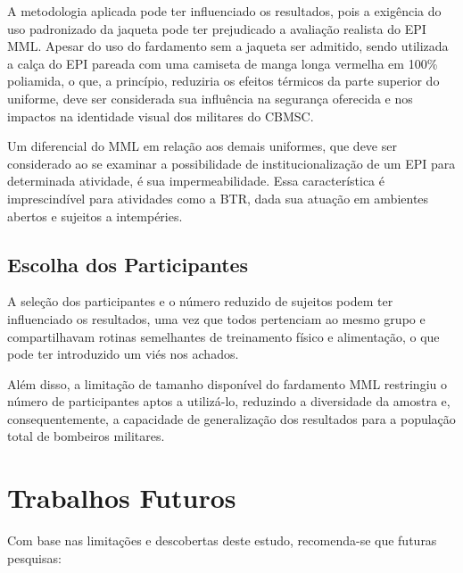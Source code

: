             A metodologia aplicada pode ter influenciado os resultados, pois a exigência do uso 
            padronizado da jaqueta pode ter prejudicado a avaliação realista do \acrshort{EPI} \acrshort{MML}.
            Apesar do uso do fardamento sem a jaqueta ser admitido, sendo utilizada a calça do \acrshort{EPI} 
            pareada com uma camiseta de manga longa vermelha em 100\% poliamida, o que, a princípio, 
            reduziria os efeitos térmicos da parte superior do uniforme, deve ser considerada sua 
            influência na segurança oferecida e nos impactos na identidade visual dos militares 
            do \acrshort{CBMSC}.

            Um diferencial do \acrshort{MML} em relação aos demais uniformes, que deve ser 
            considerado ao se examinar a possibilidade de institucionalização de um \acrshort{EPI} 
            para determinada atividade, é sua impermeabilidade. Essa característica é imprescindível 
            para atividades como a \acrlong{BTR}, dada sua atuação em ambientes abertos e sujeitos a 
            intempéries.
        
        \subsection{Escolha dos Participantes}
            A seleção dos participantes e o número reduzido de sujeitos podem ter influenciado os 
            resultados, uma vez que todos pertenciam ao mesmo grupo e compartilhavam rotinas 
            semelhantes de treinamento físico e alimentação, o que pode ter introduzido um viés nos achados.

            Além disso, a limitação de tamanho disponível do fardamento \acrshort{MML} restringiu o número de 
            participantes aptos a utilizá-lo, reduzindo a diversidade da amostra e, consequentemente, 
            a capacidade de generalização dos resultados para a população total de bombeiros militares.
        
    \section{Trabalhos Futuros}
        Com base nas limitações e descobertas deste estudo, recomenda-se que futuras pesquisas:

